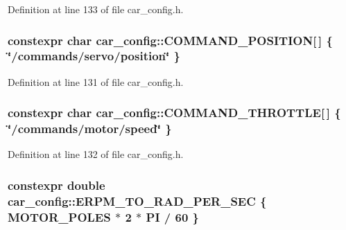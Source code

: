 Definition at line 133 of file car\+\_\+config.\+h.

\subsubsection[{\texorpdfstring{C\+O\+M\+M\+A\+N\+D\+\_\+\+P\+O\+S\+I\+T\+I\+ON}{COMMAND_POSITION}}]{\setlength{\rightskip}{0pt plus 5cm}constexpr char car\+\_\+config\+::\+C\+O\+M\+M\+A\+N\+D\+\_\+\+P\+O\+S\+I\+T\+I\+ON\mbox{[}$\,$\mbox{]} \{ \char`\"{}/commands/servo/position\char`\"{} \}}\hypertarget{namespacecar__config_a6008524bf1090f0ab0c994b2f80dcb22}{}\label{namespacecar__config_a6008524bf1090f0ab0c994b2f80dcb22}


Definition at line 131 of file car\+\_\+config.\+h.

\subsubsection[{\texorpdfstring{C\+O\+M\+M\+A\+N\+D\+\_\+\+T\+H\+R\+O\+T\+T\+LE}{COMMAND_THROTTLE}}]{\setlength{\rightskip}{0pt plus 5cm}constexpr char car\+\_\+config\+::\+C\+O\+M\+M\+A\+N\+D\+\_\+\+T\+H\+R\+O\+T\+T\+LE\mbox{[}$\,$\mbox{]} \{ \char`\"{}/commands/motor/speed\char`\"{} \}}\hypertarget{namespacecar__config_afdb192c52a9126c0bedf2ca4a7c99c2a}{}\label{namespacecar__config_afdb192c52a9126c0bedf2ca4a7c99c2a}


Definition at line 132 of file car\+\_\+config.\+h.

\subsubsection[{\texorpdfstring{E\+R\+P\+M\+\_\+\+T\+O\+\_\+\+R\+A\+D\+\_\+\+P\+E\+R\+\_\+\+S\+EC}{ERPM_TO_RAD_PER_SEC}}]{\setlength{\rightskip}{0pt plus 5cm}constexpr double car\+\_\+config\+::\+E\+R\+P\+M\+\_\+\+T\+O\+\_\+\+R\+A\+D\+\_\+\+P\+E\+R\+\_\+\+S\+EC \{ {\bf M\+O\+T\+O\+R\+\_\+\+P\+O\+L\+ES} $\ast$ 2 $\ast$ {\bf PI} / 60 \}}\hypertarget{namespacecar__config_a877c4a772a47f4737d9f03fe8a22e106}{}\label{namespacecar__config_a877c4a772a47f4737d9f03fe8a22e106}


